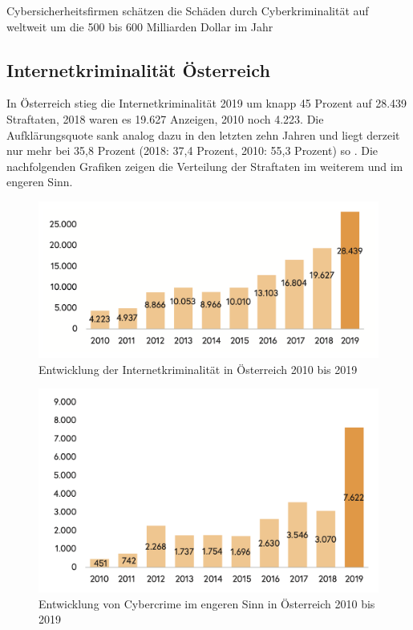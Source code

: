 Cybersicherheitsfirmen schätzen die Schäden durch Cyberkriminalität auf weltweit um die  500 bis 600 Milliarden Dollar im Jahr

\subsection{Internetkriminalität Österreich}
\label{subsection:cyber_criminality_austria}

In Österreich stieg die Internetkriminalität 2019 um knapp 45 Prozent auf 28.439 Straftaten, 2018 waren es 19.627 Anzeigen, 2010 noch 4.223. Die Aufklärungsquote sank analog dazu in den letzten zehn Jahren und liegt derzeit nur mehr bei 35,8 Prozent (2018: 37,4 Prozent, 2010: 55,3 Prozent) so \textcite[16-18]{bundeskriminalamt2020}. Die nachfolgenden Grafiken zeigen die Verteilung der Straftaten im weiterem und im engeren Sinn.

\begin{figure}[ht]
	\centering
	\includegraphics[width=1\linewidth]{images/bmi/Entwicklung_austria-2009-2019.png}
	\caption[Entwicklung der Internetkriminalität in Österreich 2010 bis 2019]
	{Entwicklung der Internetkriminalität in Österreich 2010 bis 2019 \autocite[16]{bundeskriminalamt2020}}
\end{figure}

\begin{figure}[ht]
	\centering
	\includegraphics[width=1\linewidth]{images/bmi/Entwicklung_cybercrime_austria-2009-2019.png}
	\caption[Entwicklung von Cybercrime im engeren Sinn in Österreich 2010 bis 2019]
	{Entwicklung von Cybercrime im engeren Sinn in Österreich 2010 bis 2019 \autocite[17]{bundeskriminalamt2020}}
\end{figure}

